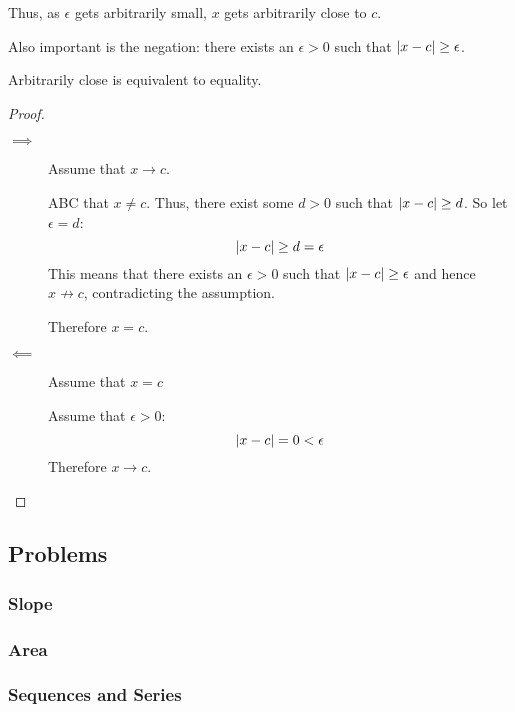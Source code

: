 \documentclass[letterpaper,12pt,fleqn]{article}
\newcommand{\e}{\epsilon}
\begin{document}
Thus, as \(\e\) gets arbitrarily small, \(x\) gets arbitrarily close to \(c\).

Also important is the negation: there exists an \(\e>0\) such that \(\abs{x-c}\ge\e\).

\begin{theorem}
  Arbitrarily close is equivalent to equality.
\end{theorem}

\begin{proof}
  \begin{description}
    \item[]
    \item[\(\implies\)] Assume that \(x\to c\).

      ABC that \(x\ne c\).  Thus, there exist some \(d>0\) such that \(\lvert x-c\rvert\ge d\).  So let \(\e=d\):
      \[\abs{x-c}\ge d=\e\]
      This means that there exists an \(\e>0\) such that \(\abs{x-c}\ge\e\) and hence \(x\not\to c\), contradicting
      the assumption.

      Therefore \(x=c\).

    \item[\(\impliedby\)] Assume that \(x=c\)

      Assume that \(\e>0\):
      \[\abs{x-c}=0<\e\]
      Therefore \(x\to c\).
  \end{description}
\end{proof}

\subsection*{Problems}

\subsubsection*{Slope}

\subsubsection*{Area}

\subsubsection*{Sequences and Series}
\end{document}
